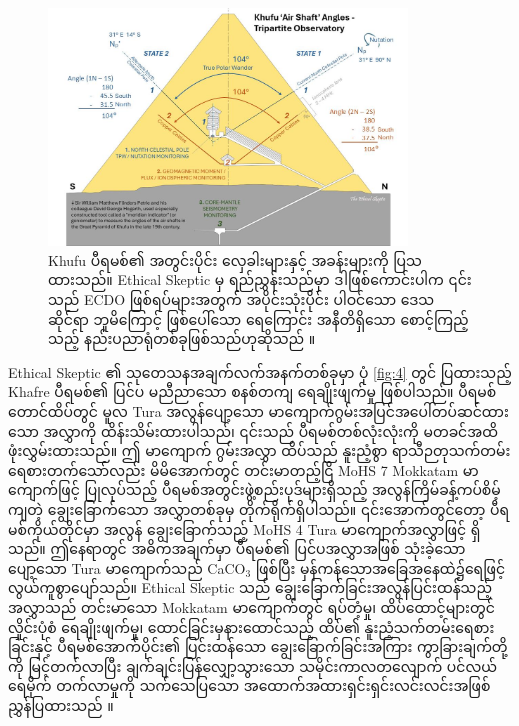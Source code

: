 \documentclass[10pt,twocolumn,letterpaper]{article}
\begin{document}
\begin{figure}[b]
\begin{center}
\includegraphics[width=0.85\textwidth]{shafts.jpg}
\end{center}
   \caption{Khufu ပီရမစ်၏ အတွင်းပိုင်း လှေခါးများနှင့် အခန်းများကို ပြသထားသည်။ Ethical Skeptic မှ ရည်ညွှန်းသည်မှာ ဒါဖြစ်ကောင်းပါက ၎င်းသည် ECDO ဖြစ်ရပ်များအတွက် အပိုင်းသုံးပိုင်း ပါဝင်သော ဒေသဆိုင်ရာ ဘူမိကြောင့် ဖြစ်ပေါ်သော ရေကြောင်း အနီတိရှိသော စောင့်ကြည့်သည့် နည်းပညာရုံတစ်ခုဖြစ်သည်ဟုဆိုသည် \cite{28}။}
\label{fig:5}
\end{figure}

Ethical Skeptic ၏ သုတေသနအချက်လက်အနက်တစ်ခုမှာ ပုံ \ref{fig:4} တွင် ပြထားသည့် Khafre ပီရမစ်၏ ပြင်ပ မညီညာသော စနစ်တကျ ရေချိုးဖျက်မှု ဖြစ်ပါသည်။ ပီရမစ်တောင်ထိပ်တွင် မူလ Tura အလွန်ပျော့သော မာကျောက်ဂွမ်းအပြင်အပေါ်တပ်ဆင်ထားသော အလွှာကို ထိန်းသိမ်းထားပါသည်၊ ၎င်းသည် ပီရမစ်တစ်လုံးလုံးကို မတခင်အထိဖုံးလွှမ်းထားသည်။ ဤ မာကျောက် ဂွမ်းအလွှာ ထိပ်သည် နူးညံ့စွာ ရာသီဉတုသက်တမ်းရေစားတက်သော်လည်း မိမိအောက်တွင် တင်းမာတည့်ငြိ MoHS 7 Mokkatam မာကျောက်ဖြင့် ပြုလုပ်သည့် ပီရမစ်အတွင်းဖွဲ့စည်းပုဒ်များရှိသည့် အလွန်ကြိမ်ခန့်ကပ်စိမ့်ကျတဲ့ ချွေးခြောက်သော အလွှာတစ်ခုမှ တိုက်ရိုက်ရှိပါသည်။ ၎င်းအောက်တွင်တော့ ပီရမစ်ကိုယ်တိုင်မှာ အလွန် ချွေးခြောက်သည့် MoHS 4 Tura မာကျောက်အလွှာဖြင့် ရှိသည်။ ဤနေရာတွင် အဓိကအချက်မှာ ပီရမစ်၏ ပြင်ပအလွှာအဖြစ် သုံးခဲ့သော ပျော့သော Tura မာကျောက်သည် CaCO$_3$ ဖြစ်ပြီး မှန်ကန်သောအခြေအနေထဲ၌ရေဖြင့် လွယ်ကူစွာပျော်သည်။ Ethical Skeptic သည် ချွေးခြောက်ခြင်းအလွန်ပြင်းထန်သည့် အလွှာသည် တင်းမာသော Mokkatam မာကျောက်တွင် ရပ်တံ့မှု၊ ထိပ်ထောင့်များတွင် လှိုင်းပုံစံ ရေချိုးဖျက်မှု၊ ထောင်ခြင်းမှနားထောင်သည့် ထိပ်၏ နူးညံ့သက်တမ်းရေစားခြင်းနှင့် ပီရမစ်အောက်ပိုင်း၏ ပြင်းထန်သော ချွေးခြောက်ခြင်းအကြား ကွာခြားချက်တို့ကို မြင့်တက်လာပြီး ချက်ချင်းပြန်လျှော့သွားသော သမိုင်းကာလတလျောက် ပင်လယ်ရေမိုက် တက်လာမှုကို သက်သေပြသော အထောက်အထားရှင်းရှင်းလင်းလင်းအဖြစ် ညွှန်ပြထားသည် \cite{27}။
\end{document}

